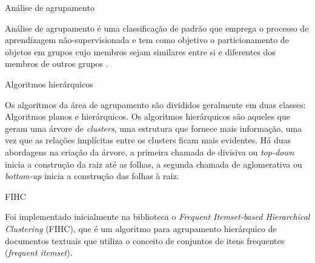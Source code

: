\documentclass[final]{beamer}
\newlength{\onecolwid}
\newlength{\twocolwid}
\begin{document}
\begin{frame}[t]
\begin{columns}[t]
\begin{column}{\twocolwid}
\begin{columns}[t,totalwidth=\twocolwid]
\begin{column}{\onecolwid}\vspace{-.6in} %


\begin{block}{Análise de agrupamento}

Análise de agrupamento é uma classificação de padrão que emprega o processo de aprendizagem não-supervisionada e tem como objetivo o particionamento de objetos em grupos cujo membros sejam similares entre si e diferentes dos membros de outros grupos \cite{Jain:1999}.


\end{block}

\begin{block}{Algoritmos hierárquicos}

Os algoritmos da área de agrupamento são divididos geralmente em duas classes: Algoritmos planos e hierárquicos.
Os algoritmos hierárquicos são aqueles que geram uma árvore de \textit{clusters},  uma estrutura que fornece mais informação, uma vez que as relações implícitas entre os clusters ficam mais evidentes.
Há duas abordagens na criação da árvore, a primeira chamada de divisiva ou \textit{top-down} inicia a construção da raiz até as folhas, a segunda chamada de aglomerativa ou \textit{bottom-up} inicia a construção das folhas à raiz.

\end{block}


\begin{block}{FIHC}

Foi implementado inicialmente na biblioteca o \textit{Frequent Itemset-based Hierarchical Clustering} (FIHC), que é um algoritmo para agrupamento hierárquico de documentos textuais \cite{Martin:2004} que utiliza o conceito de conjuntos de itens frequentes (\textit{frequent itemset}).


\end{block}
\end{column}
\end{columns}
\end{column}
\end{columns}
\end{frame}
\end{document}
